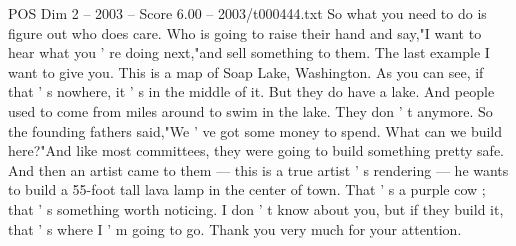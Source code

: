 \begin{textsample}{POS Dim 2 – 2003 – Score 6.00 – 2003/t000444.txt}
So what you need to do is figure out who does care.
Who is going to raise their hand and say,"I want to hear what you ' re doing next,"and sell something to them.
The last example I want to give you.
This is a map of Soap Lake, Washington.
As you can see, if that ' s nowhere, it ' s in the middle of it.
But they do have a lake.
And people used to come from miles around to swim in the lake.
They don ' t anymore.
So the founding fathers said,"We ' ve got some money to spend.
What can we build here?"And like most committees, they were going to build something pretty safe.
And then an artist came to them — this is a true artist ' s rendering — he wants to build a 55-foot tall lava lamp in the center of town.
That ' s a purple cow ; that ' s something worth noticing.
I don ' t know about you, but if they build it, that ' s where I ' m going to go.
Thank you very much for your attention.

\end{textsample}
